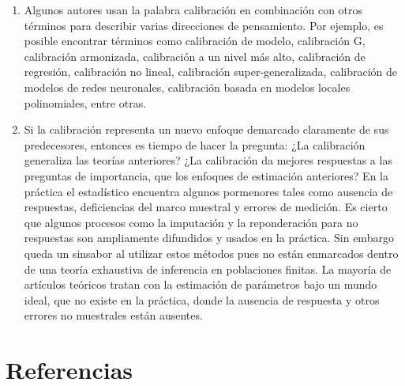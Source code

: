 \documentclass[
  12pt,
  spanish,
]{book}
\begin{document}
\begin{enumerate}
\item
  Algunos autores usan la palabra calibración en combinación con otros términos para describir varias direcciones de pensamiento. Por ejemplo, es posible encontrar términos como calibración de modelo, calibración G, calibración armonizada, calibración a un nivel más alto, calibración de regresión, calibración no lineal, calibración super-generalizada, calibración de modelos de redes neuronales, calibración basada en modelos locales polinomiales, entre otras.
\item
  Si la calibración representa un nuevo enfoque demarcado claramente de sus predecesores, entonces es tiempo de hacer la pregunta: ¿La calibración generaliza las teorías anteriores? ¿La calibración da mejores respuestas a las preguntas de importancia, que los enfoques de estimación anteriores? En la práctica el estadístico encuentra algunos pormenores tales como ausencia de respuestas, deficiencias del marco muestral y errores de medición. Es cierto que algunos procesos como la imputación y la reponderación para no respuestas son ampliamente difundidos y usados en la práctica. Sin embargo queda un sinsabor al utilizar estos métodos pues no están enmarcados dentro de una teoría exhaustiva de inferencia en poblaciones finitas. La mayoría de artículos teóricos tratan con la estimación de parámetros bajo un mundo ideal, que no existe en la práctica, donde la ausencia de respuesta y otros errores no muestrales están ausentes.
\end{enumerate}

\hypertarget{referencias}{%
\chapter*{Referencias}\label{referencias}}

  
\end{document}
